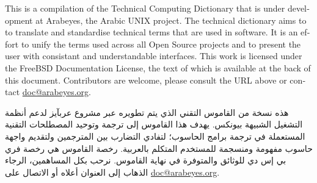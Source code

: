 
\maketitle

\begin{english}
This is a compilation of the Technical Computing Dictionary that is under development
at Arabeyes, the Arabic UNIX project. The technical dictionary aims to to translate 
and standardise technical terms that are used in software. It is an effort to unify 
the terms used across all Open Source projects and to present the user with
consistant and understandable interfaces. This work is licensed under the FreeBSD
Documentation License, the text of which is available at the back of this document.
Contributors are welcome, please consult the URL above or contact \url{doc@arabeyes.org}.
\end{english}
\vspace{5mm}

\begin{Arabic}
هذه نسخة من القاموس التقني الذي يتم تطويره عبر مشروع عربآيز لدعم أنظمة 
التشغيل الشبيهة بيونكس. يهدف هذا القاموس إلى ترجمة وتوحيد المصطلحات 
التقنية المستعملة في ترجمة برامج الحاسوب؛ لتفادي التضارب بين المترجمين 
ولتقديم واجهة حاسوب مفهومة ومنسجمة للمستخدم المتكلم بالعربية. رخصة 
القاموس هي رخصة فري بي إس دي للوثائق والمتوفرة في نهاية القاموس. نرحب 
بكل المساهمين، الرجاء الذهاب إلى العنوان أعلاه أو الاتصال على
\url{doc@arabeyes.org}.
\end{Arabic}

\newpage
